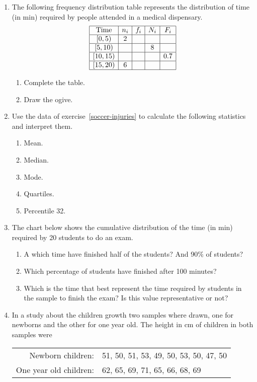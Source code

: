 \begin{enumerate}[leftmargin=*]
\item The following frequency distribution table represents the distribution of time (in min) required by people
attended in a medical dispensary. 
\[
\begin{array}{|c|c|c|c|c|}
\hline \mbox{Time} & n_{i} & f_{i} & N_{i} & F_{i}\\
\hline 
\left[ 0,5\right) & 2 &  &  &  \\ 
\hline 
\left[ 5,10\right) &  &  & 8 &  \\ 
\hline 
\left[ 10,15\right) &  & &  & 0.7 \\ 
\hline 
\left[ 15,20\right) & 6 &  &  &\\ 
\hline
\end{array}
\]

\begin{enumerate}
\item Complete the table.
\item Draw the ogive. 
\end{enumerate}

\item Use the data of exercise~\ref{soccer-injuries} to calculate the following statistics and interpret them.
\begin{enumerate}
\item Mean.
\item Median.
\item Mode.
\item Quartiles.
\item Percentile 32.
\end{enumerate}

\item The chart below shows the cumulative distribution of the time (in min)
required by 20 students to do an exam.
\begin{center}
\resizebox{0.7\textwidth}{!}{}
\end{center}

\begin{enumerate}
\item A which time have finished half of the students? And 90\% of students?
\item Which percentage of students have finished after 100 minutes?
\item Which is the time that best represent the time required by students in the sample to finish the exam? Is this
value representative or not?
\end{enumerate}

\item In a study about the children growth two samples where drawn, one for
newborns and the other for one year old.
The height in cm of children in both samples were 
\begin{center}
\begin{tabular}{rl}
Newborn children: & 51, 50, 51, 53, 49, 50, 53, 50, 47, 50\\
One year old children: & 62, 65, 69, 71, 65, 66, 68, 69
\end{tabular}
\end{center}


\end{enumerate}
